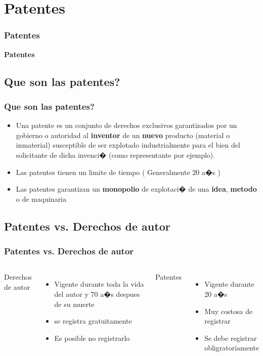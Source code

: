 \section{Patentes}
\frame
{
	\frametitle{Patentes}
	\begin{center}
	\bf \huge Patentes
	\end{center}
}

\subsection{Que son las patentes?}
\frame
{
	\frametitle{Que son las patentes?}
	\begin{itemize}
	\item Una patente es un conjunto de derechos exclusivos garantizados por un gobierno o autoridad al \textbf{inventor} de un \textbf{nuevo} producto (material o inmaterial) susceptible de ser explotado industrialmente para el bien del solicitante de dicha invenci� (como representante por ejemplo).
	\item Las patentes tienen un limite de tiempo ( Generalmente 20 a�s )
	\item Las patentes garantizan un \textbf{monopolio} de explotaci� de una \textbf{idea}, \textbf{metodo} o de maquinaria
	\end{itemize}
}

\subsection{Patentes vs. Derechos de autor}
\frame
{
	\frametitle{Patentes vs. Derechos de autor}
	
	\begin{columns}[t]
	Derechos de autor
	\begin{itemize}
	\item Vigente durante toda la vida del autor y 70 a�s despues de su muerte
	\item se registra gratuitamente
	\item Es posible no registrarlo
	\end{itemize}
	
	Patentes
	\begin{itemize}
	\item Vigente durante 20 a�s
	\item Muy costosa de registrar
	\item Se debe registrar obligratoriamente
	
	\end{itemize}
	\end{columns}
}

